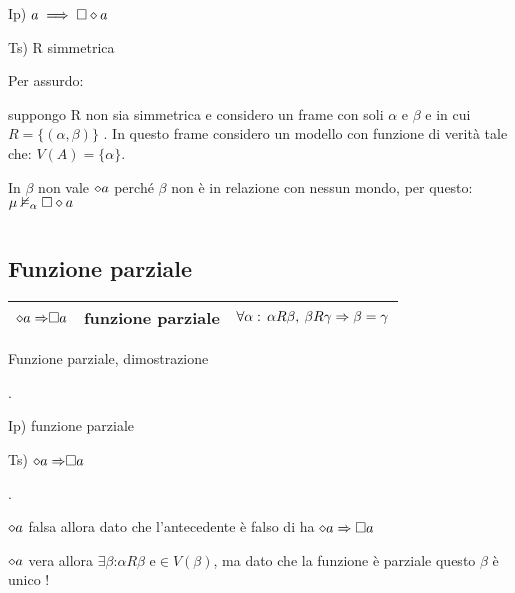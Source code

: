 Ip) $a\implies\square\diamond a$

Ts) R simmetrica

Per assurdo:

suppongo R non sia simmetrica e considero un frame con soli $\alpha$
e $\beta$ e in cui $R=\{(\alpha,\beta)\}$ . In questo frame considero
un modello con funzione di verità tale che: $V(A)=\{\alpha\}$.

In $\beta$ non vale $\diamond a$ perché $\beta$ non è in relazione con
nessun mondo, per questo: $\mu\nvDash_{\alpha}\square\diamond a$

\begin{center} 
 \end{center}

$ $

\subsection{Funzione parziale}

\begin{tabular}{|c|c|c|}
\hline 
$\diamond{a\Rightarrow}\square a$  & funzione parziale  & $\forall\alpha:\,\alpha R\beta,\:\beta R\gamma\Rightarrow\beta=\gamma$\tabularnewline
\hline 
\end{tabular}

Funzione parziale, dimostrazione

.

Ip) funzione parziale

Ts) $\diamond{a\Rightarrow}\square a$

.

$\diamond a$ falsa allora dato che l'antecedente è falso di ha $\diamond a\Rightarrow\square a$

$\diamond a$ vera allora $\exists\beta$:$\alpha R\beta$ e$\in V(\beta)$,
ma dato che la funzione è parziale questo $\beta$ è unico !

